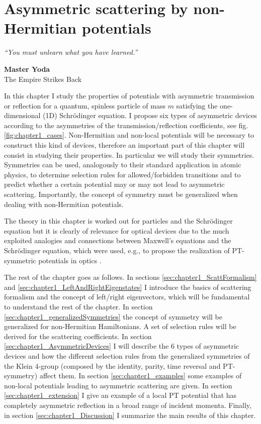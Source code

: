 
\chapter{Asymmetric scattering by non-Hermitian potentials}
\label{Chapter1}
%
\null
\textit{``You must unlearn what you have learned.''}
\begin{flushright}
  {\bf Master Yoda}\\
  The Empire Strikes Back
\end{flushright}
\null

In this chapter I study the properties of potentials with asymmetric transmission or reflection for a quantum, spinless particle of mass $m$ satisfying the one-dimensional (1D) Schr\"{o}dinger equation. I propose six types of asymmetric devices according to the asymmetries of the transmission/reflection coefficients, see fig. \ref{fig:chapter1_cases}. Non-Hermitian and non-local potentials will be necessary to construct this kind of devices, therefore an important part of this chapter will consist in studying their properties. In particular we will study their symmetries. Symmetries can be used, analogously to their standard application in atomic physics, to determine selection rules for allowed/forbidden transitions and to predict whether a certain potential may or may not lead to asymmetric scattering. Importantly, the concept of symmetry must be generalized when dealing with non-Hermitian potentials.

The theory in this chapter is worked out for particles and the Schr\"odinger equation but it is clearly of relevance for optical devices
due to the much exploited analogies and connections between Maxwell's equations and the Schr\"odinger equation,
which were used, e.g., to propose  the realization of PT-symmetric potentials in optics \cite{Ruschhaupt2005}.

The rest of the chapter goes as follows. In sections \ref{sec:chapter1_ScattFormalism} and \ref{sec:chapter1_LeftAndRightEigenstates} I introduce the basics of scattering formalism and the concept of left/right eigenvectors, which will be fundamental to understand the rest of the chapter. In section \ref{sec:chapter1_generalizedSymmetries} the concept of symmetry will be generalized for non-Hermitian Hamiltonians. A set of selection rules will be derived for the scattering coefficients. In section \ref{sec:chapter1_AsymmetricDevices} I will describe the 6 types of asymmetric devices and how the different selection rules from the generalized symmetries of the Klein 4-group (composed by the identity, parity, time reversal and PT-symmetry) affect them. In section \ref{sec:chapter1_examples} some examples of non-local potentials leading to asymmetric scattering are given. In section \ref{sec:chapter1_extension} I give an example of a local PT potential that has completely asymmetric reflection in a broad range of incident momenta. Finally, in section \ref{sec:chapter1_Discussion} I summarize the main results of this chapter.


